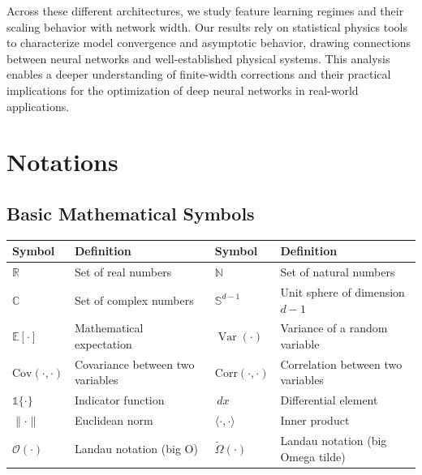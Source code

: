 \documentclass[a4paper]{article}
\newcommand{\Cov}{\text{Cov}}
\newcommand{\Corr}{\text{Corr}}
\newcommand{\E}{\mathbb{E}}
\DeclareMathOperator{\Var}{Var}
\newcommand{\indic}{\mathbb{1}}
\newcommand{\dd}{\,d}
\newcommand{\E}{\mathbb{E}}
\DeclareMathOperator{\Var}{Var}
\newcommand{\indic}{\mathbb{1}}
\newcommand{\dd}{\,d}
\theoremstyle{plain}
\theoremstyle{definition}
\theoremstyle{remark}
\begin{document}
Across these different architectures, we study feature learning regimes and their scaling behavior with network width. Our results rely on statistical physics tools to characterize model convergence and asymptotic behavior, drawing connections between neural networks and well-established physical systems. This analysis enables a deeper understanding of finite-width corrections \cite{seleznova2022ntk_beyond} and their practical implications for the optimization of deep neural networks in real-world applications.


\newpage
{}
\section*{Notations}

\begin{tcolorbox}[colback=blue!5,colframe=blue!50!black,title={\large \textbf{Mathematical Notation Reference}},enhanced,drop shadow]

\subsection*{Basic Mathematical Symbols}
\begin{longtable}{p{}p{}p{}p{}}
\toprule
\textbf{Symbol} & \textbf{Definition} & \textbf{Symbol} & \textbf{Definition} \\
\midrule
$\mathbb{R}$ & Set of real numbers & $\mathbb{N}$ & Set of natural numbers \\
$\mathbb{C}$ & Set of complex numbers & $\mathbb{S}^{d-1}$ & Unit sphere of dimension $d-1$ \\
$\E[\cdot]$ & Mathematical expectation & $\Var(\cdot)$ & Variance of a random variable \\
$\Cov(\cdot,\cdot)$ & Covariance between two variables & $\Corr(\cdot,\cdot)$ & Correlation between two variables \\
$\indic\{\cdot\}$ & Indicator function & $\dd x$ & Differential element \\
$\|\cdot\|$ & Euclidean norm & $\langle \cdot,\cdot \rangle$ & Inner product \\
$\mathcal{O}(\cdot)$ & Landau notation (big O) & $\tilde{\Omega}(\cdot)$ & Landau notation (big Omega tilde) \\
\bottomrule
\end{longtable}


\end{tcolorbox}
\end{document}
